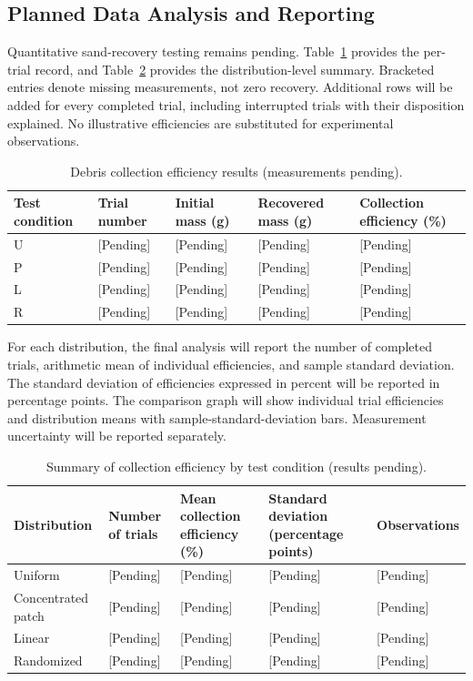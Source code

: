 \subsection{Planned Data Analysis and Reporting}
\label{sec:collection-results}
Quantitative sand-recovery testing remains pending. Table~\ref{tab:collection-trials} provides the per-trial record, and Table~\ref{tab:collection-summary} provides the distribution-level summary. Bracketed entries denote missing measurements, not zero recovery. Additional rows will be added for every completed trial, including interrupted trials with their disposition explained. No illustrative efficiencies are substituted for experimental observations.

\begin{table}[H]\centering
\caption{Debris collection efficiency results (measurements pending).}
\label{tab:collection-trials}
\begingroup\small\singlespacing\renewcommand{\arraystretch}{1.2}
\begin{tabularx}{\textwidth}{@{}XXXXX@{}}\toprule
Test condition & Trial number & Initial mass (g) & Recovered mass (g) & Collection efficiency (\%) \\\midrule
U & [Pending] & [Pending] & [Pending] & [Pending] \\
P & [Pending] & [Pending] & [Pending] & [Pending] \\
L & [Pending] & [Pending] & [Pending] & [Pending] \\
R & [Pending] & [Pending] & [Pending] & [Pending] \\
\bottomrule\end{tabularx}\endgroup
\end{table}

For each distribution, the final analysis will report the number of completed trials, arithmetic mean of individual efficiencies, and sample standard deviation. The standard deviation of efficiencies expressed in percent will be reported in percentage points. The comparison graph will show individual trial efficiencies and distribution means with sample-standard-deviation bars. Measurement uncertainty will be reported separately.

\begin{table}[H]\centering
\caption{Summary of collection efficiency by test condition (results pending).}
\label{tab:collection-summary}
\begingroup\small\singlespacing\renewcommand{\arraystretch}{1.2}
\begin{tabularx}{\textwidth}{@{}XXXXX@{}}\toprule
Distribution & Number of trials & Mean collection efficiency (\%) & Standard deviation (percentage points) & Observations \\\midrule
Uniform & [Pending] & [Pending] & [Pending] & [Pending] \\
Concentrated patch & [Pending] & [Pending] & [Pending] & [Pending] \\
Linear & [Pending] & [Pending] & [Pending] & [Pending] \\
Randomized & [Pending] & [Pending] & [Pending] & [Pending] \\
\bottomrule\end{tabularx}\endgroup
\end{table}


